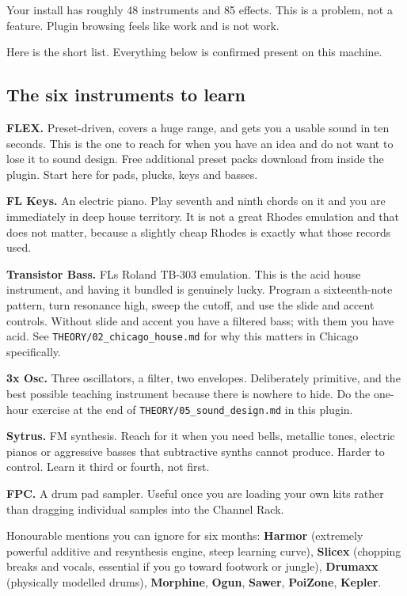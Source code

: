Your install has roughly 48 instruments and 85 effects. This is a problem, not a feature.
Plugin browsing feels like work and is not work.

Here is the short list. Everything below is confirmed present on this machine.

\subsection{The six instruments to learn}\label{fl05_plugins-the-six-instruments-to-learn}

\textbf{FLEX.} Preset-driven, covers a huge range, and gets you a usable sound in ten seconds.
This is the one to reach for when you have an idea and do not want to lose it to sound
design. Free additional preset packs download from inside the plugin. Start here for pads,
plucks, keys and basses.

\textbf{FL Keys.} An electric piano. Play seventh and ninth chords on it and you are immediately
in deep house territory. It is not a great Rhodes emulation and that does not matter,
because a slightly cheap Rhodes is exactly what those records used.

\textbf{Transistor Bass.} FL\textquotesingle s Roland TB-303 emulation. This is the acid house instrument, and
having it bundled is genuinely lucky. Program a sixteenth-note pattern, turn resonance high,
sweep the cutoff, and use the slide and accent controls. Without slide and accent you have a
filtered bass; with them you have acid. See \texttt{THEORY/02\_chicago\_house.md} for why this matters
in Chicago specifically.

\textbf{3x Osc.} Three oscillators, a filter, two envelopes. Deliberately primitive, and the best
possible teaching instrument because there is nowhere to hide. Do the one-hour exercise at
the end of \texttt{THEORY/05\_sound\_design.md} in this plugin.

\textbf{Sytrus.} FM synthesis. Reach for it when you need bells, metallic tones, electric pianos
or aggressive basses that subtractive synths cannot produce. Harder to control. Learn it
third or fourth, not first.

\textbf{FPC.} A drum pad sampler. Useful once you are loading your own kits rather than dragging
individual samples into the Channel Rack.

Honourable mentions you can ignore for six months: \textbf{Harmor} (extremely powerful additive
and resynthesis engine, steep learning curve), \textbf{Slicex} (chopping breaks and vocals,
essential if you go toward footwork or jungle), \textbf{Drumaxx} (physically modelled drums),
\textbf{Morphine}, \textbf{Ogun}, \textbf{Sawer}, \textbf{PoiZone}, \textbf{Kepler}.

